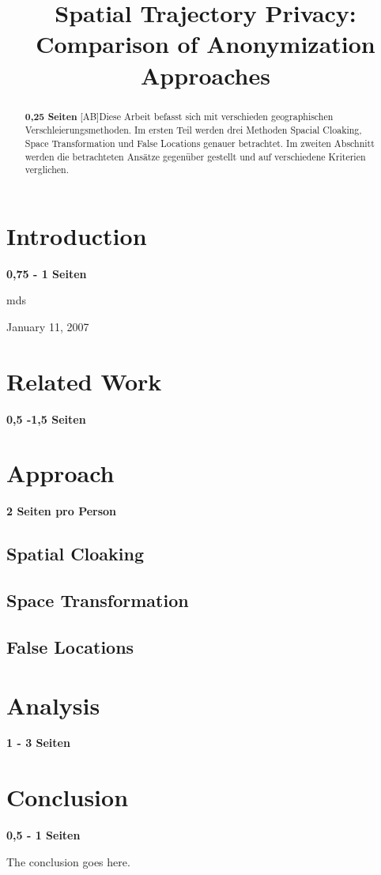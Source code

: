 \documentclass[conference]{IEEEtran}
\begin{document}
\title{Spatial Trajectory Privacy: Comparison of Anonymization Approaches}

\author{
}

\maketitle


\begin{abstract}
\textbf{0,25 Seiten}
[AB]Diese Arbeit befasst sich mit verschieden geographischen Verschleierungsmethoden. Im ersten Teil werden drei Methoden Spacial Cloaking, Space Transformation und False Locations genauer betrachtet. Im zweiten Abschnitt werden die betrachteten Ansätze gegenüber gestellt und auf verschiedene Kriterien verglichen. 
\end{abstract}

\IEEEpeerreviewmaketitle


\section{Introduction}
\textbf{0,75 - 1 Seiten}



\hfill mds
 
\hfill January 11, 2007

\section{Related Work}
\textbf{0,5 -1,5 Seiten}

 

\section{Approach}
\textbf{2 Seiten pro Person}



\subsection{Spatial Cloaking}



\subsection{Space Transformation}



\subsection{False Locations}



\section{Analysis}
\textbf{1 - 3 Seiten}



\section{Conclusion}
\textbf{0,5 - 1 Seiten}

The conclusion goes here.





\end{document}
